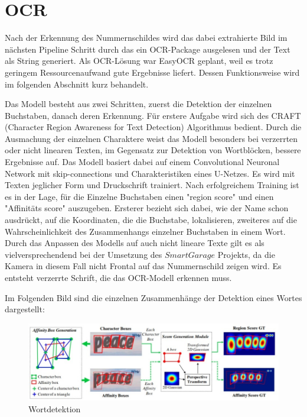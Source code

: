 
\section{OCR}
Nach der Erkennung des Nummernschildes wird das dabei extrahierte Bild im nächsten Pipeline Schritt durch das ein OCR-Package ausgelesen und der Text als String generiert. 
Als OCR-Lösung war EasyOCR geplant, weil es trotz geringem Ressourcenaufwand gute Ergebnisse liefert. Dessen Funktionsweise wird im folgenden Abschnitt kurz behandelt.

																																																																														   
																																																																  

																																																																  

Das Modell besteht aus zwei Schritten, zuerst die Detektion der einzelnen Buchstaben, danach deren Erkennung. Für erstere Aufgabe wird sich des CRAFT (Character Region Awareness for Text Detection) Algorithmus bedient. \autocite[Vgl.][]{baek2019character} Durch die Ausmachung der einzelnen Charaktere weist das Modell besonders bei verzerrten oder nicht linearen Texten, im Gegensatz zur Detektion von Wortblöcken, bessere Ergebnisse auf. Das Modell basiert dabei auf einem  Convolutional Neuronal Network mit skip-connections und Charakteristiken eines U-Netzes. Es wird mit Texten jeglicher Form und Druckschrift trainiert. Nach erfolgreichem Training ist es in der Lage, für die Einzelne Buchstaben einen "region score" und einen "Affinitäts score" auszugeben. Ersterer bezieht sich dabei, wie der Name schon ausdrückt, auf die Koordinaten, die die Buchstabe, lokalisieren, zweiteres auf die Wahrscheinlichkeit des Zusammenhangs einzelner Buchstaben in einem Wort. Durch das Anpassen des Modells auf auch nicht lineare Texte gilt es als vielversprechendend bei der Umsetzung des $SmartGarage$ Projekts, da die Kamera in diesem Fall nicht Frontal auf das Nummernschild zeigen wird. Es entsteht verzerrte Schrift, die das OCR-Modell erkennen muss.



Im Folgenden Bild sind die einzelnen Zusammenhänge der Detektion eines Wortes dargestellt: 
\begin{figure}[H]
	\centering
	\includegraphics[width=0.9\linewidth]{img/baek}
	\caption{Wortdetektion}
	\label{fig:baek}
\end{figure}


